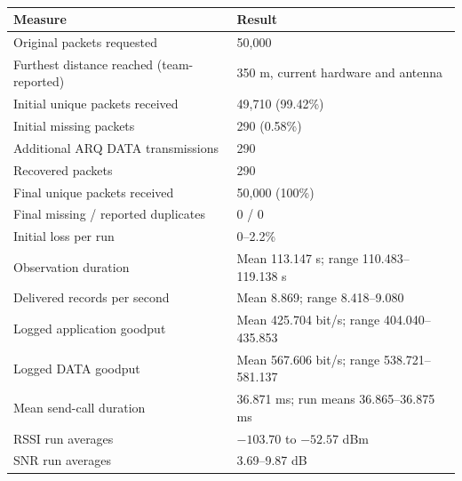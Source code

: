\FloatBarrier

\begin{table}[htbp]
\centering
\caption{}
\label{tab:communication_results}
\begin{tabular}{p{}p{}}
\toprule
Measure & Result \\
\midrule
Original packets requested & 50,000 \\
Furthest distance reached (team-reported) & 350 m, current hardware and antenna \\
Initial unique packets received & 49,710 (99.42\%) \\
Initial missing packets & 290 (0.58\%) \\
Additional ARQ DATA transmissions & 290 \\
Recovered packets & 290 \\
Final unique packets received & 50,000 (100\%) \\
Final missing / reported duplicates & 0 / 0 \\
Initial loss per run & 0--2.2\% \\
Observation duration & Mean 113.147 s; range 110.483--119.138 s \\
Delivered records per second & Mean 8.869; range 8.418--9.080 \\
Logged application goodput & Mean 425.704 bit/s; range 404.040--435.853 \\
Logged DATA goodput & Mean 567.606 bit/s; range 538.721--581.137 \\
Mean send-call duration & 36.871 ms; run means 36.865--36.875 ms \\
RSSI run averages & $-103.70$ to $-52.57$ dBm \\
SNR run averages & 3.69--9.87 dB \\
\bottomrule
\end{tabular}
\end{table}

